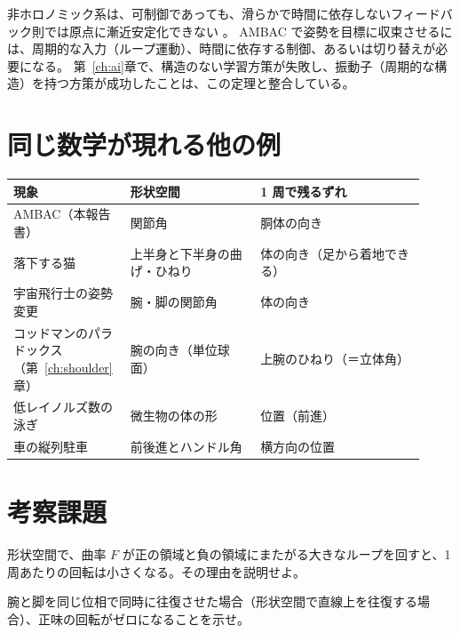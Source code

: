 非ホロノミック系は、可制御であっても、滑らかで時間に依存しないフィードバック則では原点に漸近安定化できない \cite{R9}。
AMBAC で姿勢を目標に収束させるには、周期的な入力（ループ運動）、時間に依存する制御、あるいは切り替えが必要になる。
第~\ref{ch:ai}章で、構造のない学習方策が失敗し、振動子（周期的な構造）を持つ方策が成功したことは、この定理と整合している。

\section{同じ数学が現れる他の例}

\begin{longtable}{p{0.24\linewidth}p{0.30\linewidth}p{0.38\linewidth}}
\toprule
現象 & 形状空間 & 1 周で残るずれ \\ \midrule \endhead
AMBAC（本報告書） & 関節角 & 胴体の向き \\
落下する猫 \cite{R4,R7} & 上半身と下半身の曲げ・ひねり & 体の向き（足から着地できる） \\
宇宙飛行士の姿勢変更 \cite{R8} & 腕・脚の関節角 & 体の向き \\
コッドマンのパラドックス（第~\ref{ch:shoulder}章） & 腕の向き（単位球面） & 上腕のひねり（＝立体角） \\
低レイノルズ数の泳ぎ \cite{R6} & 微生物の体の形 & 位置（前進） \\
車の縦列駐車 & 前後進とハンドル角 & 横方向の位置 \\
\bottomrule
\end{longtable}

\section*{考察課題}
\begin{exercise}
形状空間で、曲率 $F$ が正の領域と負の領域にまたがる大きなループを回すと、1 周あたりの回転は小さくなる。その理由を説明せよ。
\end{exercise}
\begin{exercise}
腕と脚を同じ位相で同時に往復させた場合（形状空間で直線上を往復する場合）、正味の回転がゼロになることを示せ。
\end{exercise}
